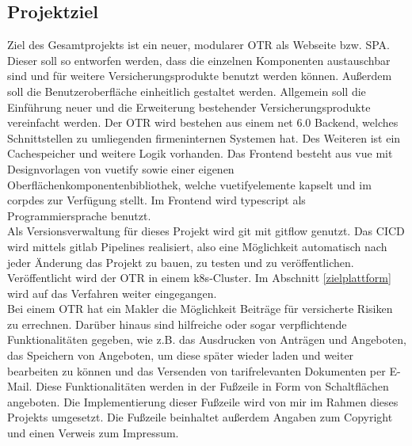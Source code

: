 \subsection{Projektziel}
\label{projektziel}
Ziel des Gesamtprojekts ist ein neuer, modularer \ac{OTR} als Webseite bzw. \ac{SPA}. Dieser soll so entworfen werden, dass die einzelnen Komponenten austauschbar sind und für weitere Versicherungsprodukte benutzt werden können. Außerdem soll die Benutzeroberfläche einheitlich gestaltet werden. Allgemein soll die Einführung neuer und die Erweiterung bestehender Versicherungsprodukte vereinfacht werden. Der \ac{OTR} wird bestehen aus einem \gls{net} 6.0 Backend, welches Schnittstellen zu umliegenden firmeninternen Systemen hat. Des Weiteren ist ein Cachespeicher und weitere Logik vorhanden. Das Frontend besteht aus \gls{vue} mit Designvorlagen von \gls{vuetify} sowie einer eigenen Oberflächenkomponentenbibliothek, welche \gls{vuetify}elemente kapselt und im \gls{corpdes} zur Verfügung stellt. Im Frontend wird \gls{typescript} als Programmiersprache benutzt.\\
Als Versionsverwaltung für dieses Projekt wird \gls{git} mit \gls{gitflow} genutzt. Das \ac{CICD} wird mittels \gls{gitlab} Pipelines realisiert, also eine Möglichkeit automatisch nach jeder Änderung das Projekt zu bauen, zu testen und zu veröffentlichen. Veröffentlicht wird der \ac{OTR} in einem \gls{k8s}-Cluster. Im Abschnitt \ref{zielplattform}  wird auf das Verfahren weiter eingegangen.
\\
Bei einem \ac{OTR} hat ein Makler die Möglichkeit Beiträge für versicherte Risiken zu errechnen. Darüber hinaus sind hilfreiche oder sogar verpflichtende Funktionalitäten gegeben, wie z.B. das Ausdrucken von Anträgen und Angeboten, das Speichern von Angeboten, um diese später wieder laden und weiter bearbeiten zu können und das Versenden von tarifrelevanten Dokumenten per E-Mail. Diese Funktionalitäten werden in der Fußzeile in Form von Schaltflächen angeboten. Die Implementierung dieser Fußzeile wird von mir im Rahmen dieses Projekts umgesetzt. Die Fußzeile beinhaltet außerdem Angaben zum Copyright und einen Verweis zum Impressum.
\\

